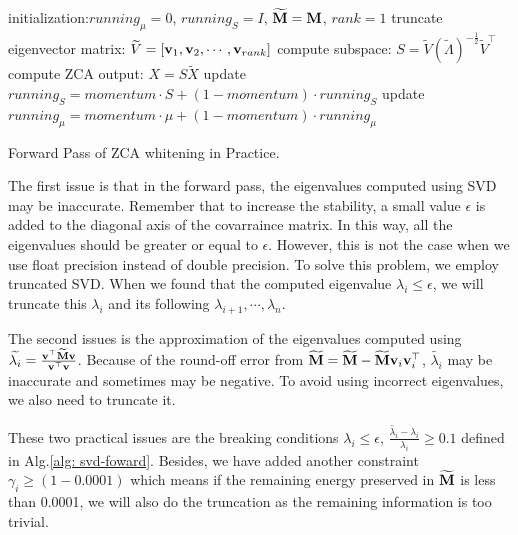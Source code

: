 \begin{algorithm}[H]
 initialization:$running_{\mu}=0$, $running_{S}=I$, $\widetilde{\mathbf{M}} = \mathbf{M}$,  $rank=1$\; 
   {truncate eigenvector matrix: $\widetilde{V}=[\mathbf{v}_1, \mathbf{v}_2, \cdots, \mathbf{v}_{rank}]$
   compute subspace: $S=\widetilde{V}(\widetilde{\Lambda})^{-\frac{1}{2}}\widetilde{V}^{\top}$\;
   compute ZCA output: $X=S\widetilde{X}$\;
   update $running_{S} = momentum \cdot S + (1-momentum) \cdot running_{S}$\;
   update $running_{\mu} = momentum \cdot \mu + (1-momentum) \cdot running_{\mu}$\;
   }

 \caption{Forward Pass of ZCA whitening in Practice.}
 \label{alg: svd-foward}
\end{algorithm}


The first issue is that in the forward pass, the eigenvalues computed using SVD may be inaccurate.
Remember that to increase the stability, a small value $\epsilon$ is added to the diagonal axis of the covarraince matrix.
In this way, all the eigenvalues should be greater or equal to $\epsilon$. However, this is not the case when we use float precision instead of double precision.
To solve this problem, we employ truncated SVD.
When we found that the computed eigenvalue $\lambda_i \leq \epsilon$, we will truncate this $\lambda_i$ and its following $\lambda_{i+1}, \cdots,\lambda_{n}$.

The second issues is the approximation of the eigenvalues computed using $\widetilde{\lambda_i} = \frac{\mathbf{v}^{\top} \widetilde{\mathbf{M}} \mathbf{v}}{\mathbf{v}^{\top}\mathbf{v}}$.
Because of the round-off error from $\widetilde{\mathbf{M}} = \widetilde{\mathbf{M}} -  \widetilde{\mathbf{M}}\mathbf{v}_i\mathbf{v}_i^{\top}$, $\widetilde{\lambda_i}$ may be inaccurate and sometimes may be negative.
To avoid using incorrect eigenvalues, we also need to truncate it.

These two practical issues are the breaking conditions $\lambda_i \leq \epsilon$, $\frac{\widetilde{\lambda_i}-\lambda_i}{\lambda_i} \geq 0.1$ defined in Alg.\ref{alg: svd-foward}. Besides, we have added another constraint $\gamma_i \geq (1-0.0001)$ which means if the remaining energy preserved in $\widetilde{\mathbf{M}}$ is less than 0.0001, we will also do the truncation as the remaining information is too trivial.